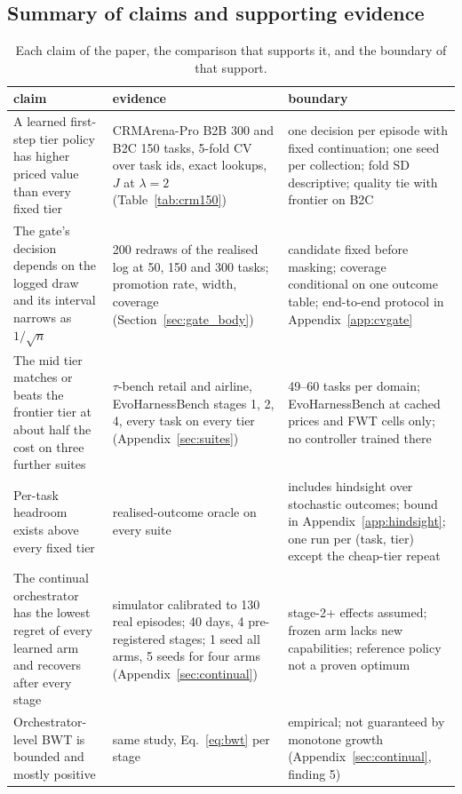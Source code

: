 \documentclass[10pt]{article}
\begin{document}
\subsection{Summary of claims and supporting evidence}
\label{app:claims}

\begin{table}[H]
\centering\footnotesize
\caption{Each claim of the paper, the comparison that supports it, and the boundary of that support.}
\label{tab:claims}
\begin{tabular}{p{4.6cm}p{5.2cm}p{5.8cm}}
\toprule
claim & evidence & boundary \\
\midrule
A learned first-step tier policy has higher priced value than every fixed tier & CRMArena-Pro B2B 300 and B2C 150 tasks, 5-fold CV over task ids, exact lookups, $J$ at $\lambda=2$ (Table~\ref{tab:crm150}) & one decision per episode with fixed continuation; one seed per collection; fold SD descriptive; quality tie with frontier on B2C \\
The gate's decision depends on the logged draw and its interval narrows as $1/\sqrt n$ & 200 redraws of the realised log at 50, 150 and 300 tasks; promotion rate, width, coverage (Section~\ref{sec:gate_body}) & candidate fixed before masking; coverage conditional on one outcome table; end-to-end protocol in Appendix~\ref{app:cvgate} \\
The mid tier matches or beats the frontier tier at about half the cost on three further suites & $\tau$-bench retail and airline, EvoHarnessBench stages 1, 2, 4, every task on every tier (Appendix~\ref{sec:suites}) & 49--60 tasks per domain; EvoHarnessBench at cached prices and FWT cells only; no controller trained there \\
Per-task headroom exists above every fixed tier & realised-outcome oracle on every suite & includes hindsight over stochastic outcomes; bound in Appendix~\ref{app:hindsight}; one run per (task, tier) except the cheap-tier repeat \\
The continual orchestrator has the lowest regret of every learned arm and recovers after every stage & simulator calibrated to 130 real episodes; 40 days, 4 pre-registered stages; 1 seed all arms, 5 seeds for four arms (Appendix~\ref{sec:continual}) & stage-2+ effects assumed; frozen arm lacks new capabilities; reference policy not a proven optimum \\
Orchestrator-level BWT is bounded and mostly positive & same study, Eq.~\eqref{eq:bwt} per stage & empirical; not guaranteed by monotone growth (Appendix~\ref{sec:continual}, finding 5) \\

\end{tabular}
\end{table}
\end{document}
